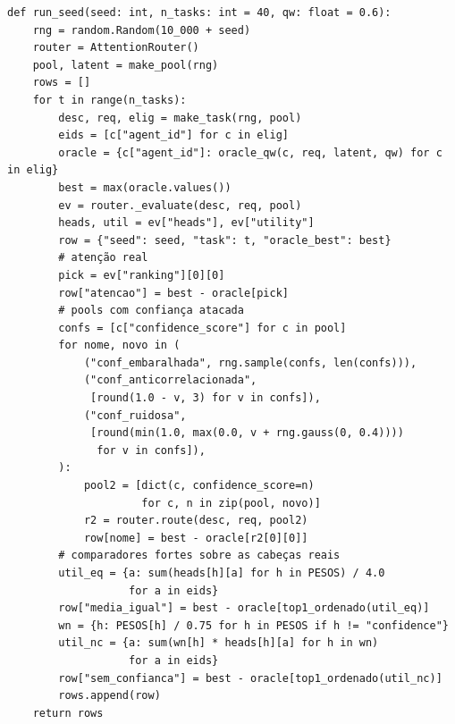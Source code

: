 \documentclass[12pt,openany,oneside,a4paper,brazil,chapter=TITLE]{abntex2}
\begin{document}
\begin{lstlisting}
def run_seed(seed: int, n_tasks: int = 40, qw: float = 0.6):
    rng = random.Random(10_000 + seed)
    router = AttentionRouter()
    pool, latent = make_pool(rng)
    rows = []
    for t in range(n_tasks):
        desc, req, elig = make_task(rng, pool)
        eids = [c["agent_id"] for c in elig]
        oracle = {c["agent_id"]: oracle_qw(c, req, latent, qw) for c in elig}
        best = max(oracle.values())
        ev = router._evaluate(desc, req, pool)
        heads, util = ev["heads"], ev["utility"]
        row = {"seed": seed, "task": t, "oracle_best": best}
        # atenção real
        pick = ev["ranking"][0][0]
        row["atencao"] = best - oracle[pick]
        # pools com confiança atacada
        confs = [c["confidence_score"] for c in pool]
        for nome, novo in (
            ("conf_embaralhada", rng.sample(confs, len(confs))),
            ("conf_anticorrelacionada",
             [round(1.0 - v, 3) for v in confs]),
            ("conf_ruidosa",
             [round(min(1.0, max(0.0, v + rng.gauss(0, 0.4))))
              for v in confs]),
        ):
            pool2 = [dict(c, confidence_score=n)
                     for c, n in zip(pool, novo)]
            r2 = router.route(desc, req, pool2)
            row[nome] = best - oracle[r2[0][0]]
        # comparadores fortes sobre as cabeças reais
        util_eq = {a: sum(heads[h][a] for h in PESOS) / 4.0
                   for a in eids}
        row["media_igual"] = best - oracle[top1_ordenado(util_eq)]
        wn = {h: PESOS[h] / 0.75 for h in PESOS if h != "confidence"}
        util_nc = {a: sum(wn[h] * heads[h][a] for h in wn)
                   for a in eids}
        row["sem_confianca"] = best - oracle[top1_ordenado(util_nc)]
        rows.append(row)
    return rows



\end{lstlisting}
\end{document}
